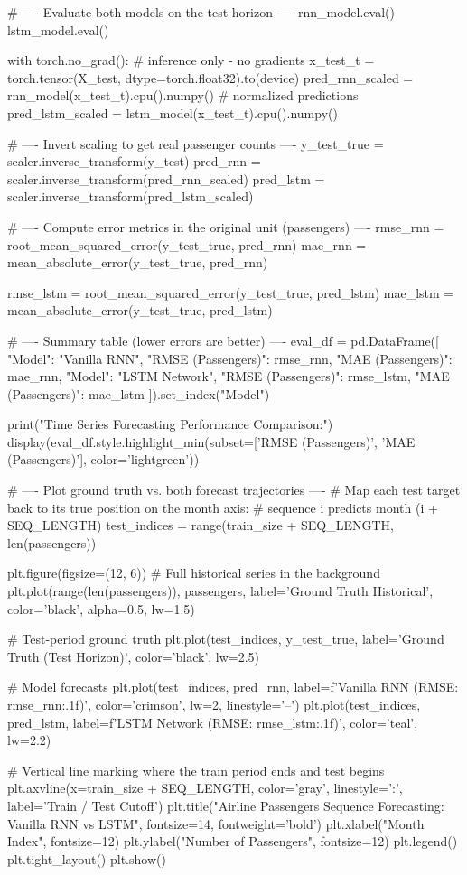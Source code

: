 \begin{codebox}[title={Evaluate both models on the test horizon}]
# ---- Evaluate both models on the test horizon ----
rnn_model.eval()
lstm_model.eval()

with torch.no_grad():   # inference only - no gradients
    x_test_t = torch.tensor(X_test, dtype=torch.float32).to(device)
    pred_rnn_scaled = rnn_model(x_test_t).cpu().numpy()    # normalized predictions
    pred_lstm_scaled = lstm_model(x_test_t).cpu().numpy()

# ---- Invert scaling to get real passenger counts ----
y_test_true = scaler.inverse_transform(y_test)
pred_rnn = scaler.inverse_transform(pred_rnn_scaled)
pred_lstm = scaler.inverse_transform(pred_lstm_scaled)

# ---- Compute error metrics in the original unit (passengers) ----
rmse_rnn = root_mean_squared_error(y_test_true, pred_rnn)
mae_rnn  = mean_absolute_error(y_test_true, pred_rnn)

rmse_lstm = root_mean_squared_error(y_test_true, pred_lstm)
mae_lstm  = mean_absolute_error(y_test_true, pred_lstm)

# ---- Summary table (lower errors are better) ----
eval_df = pd.DataFrame([
    {"Model": "Vanilla RNN", "RMSE (Passengers)": rmse_rnn, "MAE (Passengers)": mae_rnn},
    {"Model": "LSTM Network", "RMSE (Passengers)": rmse_lstm, "MAE (Passengers)": mae_lstm}
]).set_index("Model")

print("Time Series Forecasting Performance Comparison:")
display(eval_df.style.highlight_min(subset=['RMSE (Passengers)', 'MAE (Passengers)'], color='lightgreen'))

# ---- Plot ground truth vs. both forecast trajectories ----
# Map each test target back to its true position on the month axis:
# sequence i predicts month (i + SEQ_LENGTH)
test_indices = range(train_size + SEQ_LENGTH, len(passengers))

plt.figure(figsize=(12, 6))
# Full historical series in the background
plt.plot(range(len(passengers)), passengers, label='Ground Truth Historical', color='black', alpha=0.5, lw=1.5)

# Test-period ground truth
plt.plot(test_indices, y_test_true, label='Ground Truth (Test Horizon)', color='black', lw=2.5)

# Model forecasts
plt.plot(test_indices, pred_rnn, label=f'Vanilla RNN (RMSE: {rmse_rnn:.1f})', color='crimson', lw=2, linestyle='--')
plt.plot(test_indices, pred_lstm, label=f'LSTM Network (RMSE: {rmse_lstm:.1f})', color='teal', lw=2.2)

# Vertical line marking where the train period ends and test begins
plt.axvline(x=train_size + SEQ_LENGTH, color='gray', linestyle=':', label='Train / Test Cutoff')
plt.title("Airline Passengers Sequence Forecasting: Vanilla RNN vs LSTM", fontsize=14, fontweight='bold')
plt.xlabel("Month Index", fontsize=12)
plt.ylabel("Number of Passengers", fontsize=12)
plt.legend()
plt.tight_layout()
plt.show()
\end{codebox}

